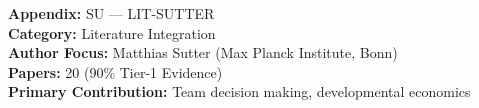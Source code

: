 %
%

%
%
%
%
%

\begin{tcolorbox}[colback=gray!5!white, colframe=gray!75!black,
    title=Appendix Metadata]
\textbf{Appendix:} SU --- LIT-SUTTER \\
\textbf{Category:} Literature Integration \\
\textbf{Author Focus:} Matthias Sutter (Max Planck Institute, Bonn) \\
\textbf{Papers:} 20 (90\% Tier-1 Evidence) \\
\textbf{Primary Contribution:} Team decision making, developmental economics
\end{tcolorbox}

